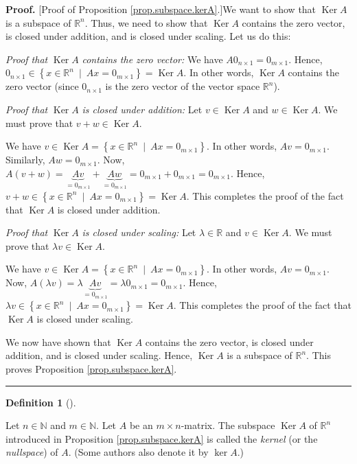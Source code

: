 \documentclass[numbers=enddot,12pt,final,onecolumn,notitlepage]{scrartcl}%
\theoremstyle{definition}
\newtheorem{defi}[theo]{Definition}
\newenvironment{definition}[1][]
{\begin{defi}[#1]\begin{leftbar}}
{\end{leftbar}\end{defi}}
\newenvironment{proof}[1][Proof]{\noindent\textbf{#1.} }{\ \rule{0.5em}{0.5em}}
\begin{document}
\begin{proof}
[Proof of Proposition \ref{prop.subspace.kerA}.]We want to show that
$\operatorname*{Ker}A$ is a subspace of $\mathbb{R}^{n}$. Thus, we need to
show that $\operatorname*{Ker}A$ contains the zero vector, is closed under
addition, and is closed under scaling. Let us do this:

\textit{Proof that }$\operatorname*{Ker}A$\textit{ contains the zero vector:}
We have $A0_{n\times1}=0_{m\times1}$. Hence, $0_{n\times1}\in\left\{
x\in\mathbb{R}^{n}\ \mid\ Ax=0_{m\times1}\right\}  =\operatorname*{Ker}A$. In
other words, $\operatorname*{Ker}A$ contains the zero vector (since
$0_{n\times1}$ is the zero vector of the vector space $\mathbb{R}^{n}$).

\textit{Proof that }$\operatorname*{Ker}A$ \textit{is closed under addition:}
Let $v\in\operatorname*{Ker}A$ and $w\in\operatorname*{Ker}A$. We must prove
that $v+w\in\operatorname*{Ker}A$.

We have $v\in\operatorname*{Ker}A=\left\{  x\in\mathbb{R}^{n}\ \mid
\ Ax=0_{m\times1}\right\}  $. In other words, $Av=0_{m\times1}$. Similarly,
$Aw=0_{m\times1}$. Now, $A\left(  v+w\right)  =\underbrace{Av}_{=0_{m\times1}%
}+\underbrace{Aw}_{=0_{m\times1}}=0_{m\times1}+0_{m\times1}=0_{m\times1}$.
Hence, $v+w\in\left\{  x\in\mathbb{R}^{n}\ \mid\ Ax=0_{m\times1}\right\}
=\operatorname*{Ker}A$. This completes the proof of the fact that
$\operatorname*{Ker}A$ is closed under addition.

\textit{Proof that }$\operatorname*{Ker}A$ \textit{is closed under scaling:}
Let $\lambda\in\mathbb{R}$ and $v\in\operatorname*{Ker}A$. We must prove that
$\lambda v\in\operatorname*{Ker}A$.

We have $v\in\operatorname*{Ker}A=\left\{  x\in\mathbb{R}^{n}\ \mid
\ Ax=0_{m\times1}\right\}  $. In other words, $Av=0_{m\times1}$. Now,
$A\left(  \lambda v\right)  =\lambda\underbrace{Av}_{=0_{m\times1}}%
=\lambda0_{m\times1}=0_{m\times1}$. Hence, $\lambda v\in\left\{
x\in\mathbb{R}^{n}\ \mid\ Ax=0_{m\times1}\right\}  =\operatorname*{Ker}A$.
This completes the proof of the fact that $\operatorname*{Ker}A$ is closed
under scaling.

We now have shown that $\operatorname*{Ker}A$ contains the zero vector, is
closed under addition, and is closed under scaling. Hence,
$\operatorname*{Ker}A$ is a subspace of $\mathbb{R}^{n}$. This proves
Proposition \ref{prop.subspace.kerA}.
\end{proof}

\begin{definition}
\label{def.subspace.kerA}Let $n\in\mathbb{N}$ and $m\in\mathbb{N}$. Let $A$ be
an $m\times n$-matrix. The subspace $\operatorname*{Ker}A$ of $\mathbb{R}^{n}$
introduced in Proposition \ref{prop.subspace.kerA} is called the
\textit{kernel} (or the \textit{nullspace}) of $A$. (Some authors also denote
it by $\ker A$.)
\end{definition}
\end{document}
